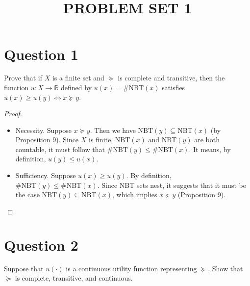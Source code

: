 \documentclass{article}
\title{PROBLEM SET 1}
\date{}
\begin{document}
\maketitle

\section*{Question 1}
Prove that if $X$ is a finite set and $\succeq$ is complete and 
transitive, then the function $u: X \to \mathbb{R}$ defined by 
$u(x) = \#\textrm{NBT}(x)$ satisfies $u(x) \geq u(y) \Leftrightarrow x \succeq y$.

\begin{proof} $\quad$

\begin{itemize}
\item Necessity. Suppose $x \succeq y$. Then we have 
$\textrm{NBT}(y) \subseteq \textrm{NBT}(x)$ (by Proposition 9).
Since $X$ is finite, $\textrm{NBT}(x)$ and $\textrm{NBT}(y)$ are both countable, it must follow that 
$\#\textrm{NBT}(y) \leq \#\textrm{NBT}(x)$. 
It means, by definition, $u(y) \leq u(x)$.

\item Sufficiency. Suppose $u(x) \geq u(y)$. By definition, 
$\#\textrm{NBT}(y) \leq \#\textrm{NBT}(x)$. 
Since NBT sets nest, it suggests that it must be the case 
$\textrm{NBT}(y) \subseteq \textrm{NBT}(x)$, 
which implies $x \succeq y$ (Proposition 9).
\end{itemize}    
\end{proof}


\section*{Question 2}
Suppose that $u(\cdot)$ is a continuous utility function 
representing $\succeq$. Show that $\succeq$ is complete, 
transitive, and continuous. 
\end{document}
